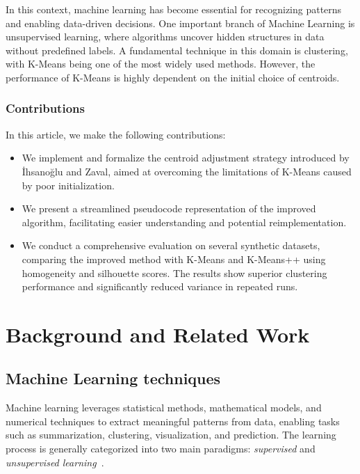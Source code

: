 \documentclass[10pt,twocolumn,letterpaper]{article}
\begin{document}
In this context, machine learning has become essential for recognizing patterns
and enabling data-driven decisions. One important branch of Machine Learning is
unsupervised learning, where algorithms uncover hidden structures in data
without predefined labels. A fundamental technique in this domain is
clustering, with K-Means being one of the most widely used methods. However,
the performance of K-Means is highly dependent on the initial choice of
centroids.

\subsubsection{Contributions}

In this article, we make the following contributions:

\begin{itemize}
    \item We implement and formalize the centroid adjustment strategy introduced by
          İhsanoğlu and Zaval, aimed at overcoming the limitations of K-Means caused by
          poor initialization.
    \item We present a streamlined pseudocode representation of the improved algorithm,
          facilitating easier understanding and potential reimplementation.
    \item We conduct a comprehensive evaluation on several synthetic datasets, comparing
          the improved method with K-Means and K-Means++ using homogeneity and silhouette
          scores. The results show superior clustering performance and significantly
          reduced variance in repeated runs.
\end{itemize}


\section{Background and Related Work}\label{sec:background-and-related-work}


\subsection{Machine Learning techniques}\label{subsec:machine-learning-techniques}

Machine learning leverages statistical methods, mathematical models, and
numerical techniques to extract meaningful patterns from data, enabling tasks
such as summarization, clustering, visualization, and prediction. The learning
process is generally categorized into two main paradigms: \textit{supervised}
and \textit{unsupervised learning}~\cite{deuschle2019}.
\end{document}
